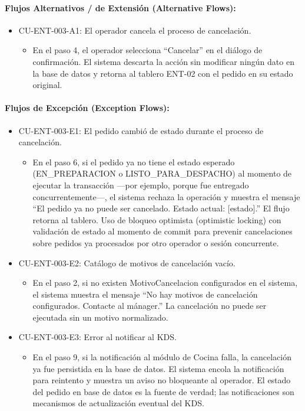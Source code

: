 \paragraph{Flujos Alternativos / de Extensión (Alternative Flows):}
\begin{itemize}
    \item CU-ENT-003-A1: El operador cancela el proceso de cancelación.
    \begin{itemize}
        \item En el paso 4, el operador selecciona ``Cancelar'' en el diálogo de confirmación. El sistema descarta la acción sin modificar ningún dato en la base de datos y retorna al tablero ENT-02 con el pedido en su estado original.
    \end{itemize}
\end{itemize}

\paragraph{Flujos de Excepción (Exception Flows):}
\begin{itemize}
    \item CU-ENT-003-E1: El pedido cambió de estado durante el proceso de cancelación.
    \begin{itemize}
        \item En el paso 6, si el pedido ya no tiene el estado esperado (EN\_PREPARACION o LISTO\_PARA\_DESPACHO) al momento de ejecutar la transacción ---por ejemplo, porque fue entregado concurrentemente---, el sistema rechaza la operación y muestra el mensaje ``El pedido ya no puede ser cancelado. Estado actual: [estado].'' El flujo retorna al tablero. Uso de bloqueo optimista (optimistic locking) con validación de estado al momento de commit para prevenir cancelaciones sobre pedidos ya procesados por otro operador o sesión concurrente.
    \end{itemize}
    \item CU-ENT-003-E2: Catálogo de motivos de cancelación vacío.
    \begin{itemize}
        \item En el paso 2, si no existen MotivoCancelacion configurados en el sistema, el sistema muestra el mensaje ``No hay motivos de cancelación configurados. Contacte al mánager.'' La cancelación no puede ser ejecutada sin un motivo normalizado.
    \end{itemize}
    \item CU-ENT-003-E3: Error al notificar al KDS.
    \begin{itemize}
        \item En el paso 9, si la notificación al módulo de Cocina falla, la cancelación ya fue persistida en la base de datos. El sistema encola la notificación para reintento y muestra un aviso no bloqueante al operador. El estado del pedido en base de datos es la fuente de verdad; las notificaciones son mecanismos de actualización eventual del KDS.
    \end{itemize}
\end{itemize}

